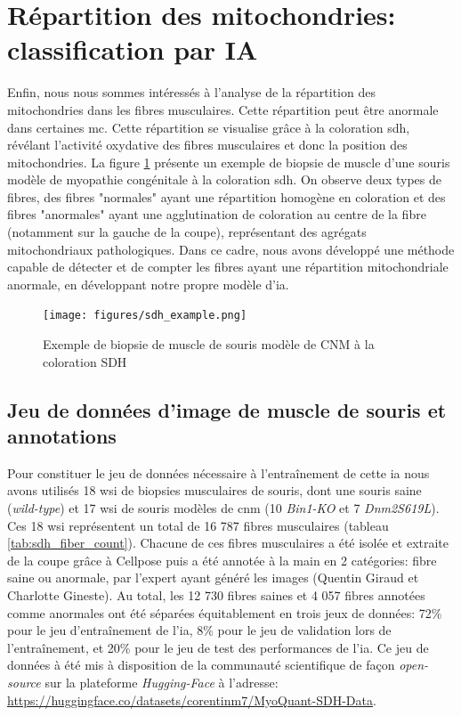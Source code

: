 \section{Répartition des mitochondries: classification par IA}
Enfin, nous nous sommes intéressés à l'analyse de la répartition des mitochondries dans les fibres musculaires. Cette répartition peut être anormale dans certaines \gls{mc}. Cette répartition se visualise grâce à la coloration \gls{sdh}, révélant l'activité oxydative des fibres musculaires et donc la position des mitochondries. La figure \ref{fig:sdh_example} présente un exemple de biopsie de muscle d'une souris modèle de myopathie congénitale à la coloration \gls{sdh}. On observe deux types de fibres, des fibres "normales" ayant une répartition homogène en coloration et des fibres "anormales" ayant une agglutination de coloration au centre de la fibre (notamment sur la gauche de la coupe), représentant des agrégats mitochondriaux pathologiques. Dans ce cadre, nous avons développé une méthode capable de détecter et de compter les fibres ayant une répartition mitochondriale anormale, en développant notre propre modèle d'\gls{ia}.

\begin{figure}[!ht]
 \centering
 \texttt{[image: figures/sdh\_example.png]}
 \caption[Exemple de biopsie musculaire à la coloration SDH]{Exemple de biopsie de muscle de souris modèle de CNM à la coloration SDH}
 \label{fig:sdh_example}
\end{figure}
\subsection{Jeu de données d'image de muscle de souris et annotations}
Pour constituer le jeu de données nécessaire à l'entraînement de cette \gls{ia} nous avons utilisés 18 \gls{wsi} de biopsies musculaires de souris, dont une souris saine (\textit{wild-type}) et 17 \gls{wsi} de souris modèles de \gls{cnm} (10 \textit{Bin1-KO} et 7 \textit{Dnm2S619L}). Ces 18 \gls{wsi} représentent un total de 16 787 fibres musculaires (tableau \ref{tab:sdh_fiber_count}). Chacune de ces fibres musculaires a été isolée et extraite de la coupe grâce à Cellpose puis a été annotée à la main en 2 catégories: fibre saine ou anormale, par l'expert ayant généré les images (Quentin Giraud et Charlotte Gineste). Au total, les 12 730 fibres saines et 4 057 fibres annotées comme anormales ont été séparées équitablement en trois jeux de données: 72\% pour le jeu d'entraînement de l'\gls{ia}, 8\% pour le jeu de validation lors de l'entraînement, et 20\% pour le jeu de test des performances de l'\gls{ia}. Ce jeu de données à été mis à disposition de la communauté scientifique de façon \textit{open-source} sur la plateforme \textit{Hugging-Face} à l'adresse: \href{https://huggingface.co/datasets/corentinm7/MyoQuant-SDH-Data}{https://huggingface.co/datasets/corentinm7/MyoQuant-SDH-Data}.


